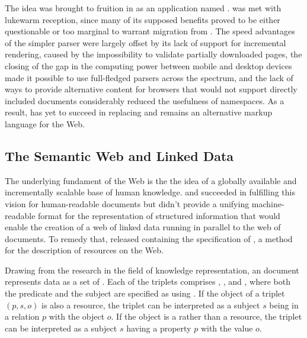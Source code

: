 \documentclass{book}
\begin{document}
The idea was brought to fruition in \cite{pemberton00} as an 
application named .  was met with lukewarm
reception, since many of its supposed benefits proved to be either questionable
or too marginal to warrant migration from . The speed advantages
of the simpler parser were largely offset by its lack of support for incremental
rendering, caused by the impossibility to validate partially downloaded pages,
the closing of the gap in the computing power between mobile and desktop devices
made it possible to use full-fledged  parsers across the spectrum,
and the lack of ways to provide alternative content for browsers that would not
support directly included  documents considerably reduced the
usefulness of  namespaces. As a result,  has yet to
succeed in replacing  and remains an alternative markup language
for the Web.


\subsection{The Semantic Web and Linked Data}
The underlying fundament of the Web is the the idea of a globally available and
incrementally scalable base of human knowledge.  and
 succeeded in fulfilling this vision for human-readable documents
but didn't provide a unifying machine-readable format for the representation of
structured information that would enable the creation of a web of linked data
running in parallel to the web of documents. To remedy that, 
released \cite{lassira99} containing the specification of , a
method for the description of resources on the Web.

Drawing from the research in the field of knowledge representation, an
 document represents data as a set of %
. Each of the triplets comprises , , and ,
where both the predicate and the subject are specified as 
 using . If the object of a triplet
$(p,s,o)$ is also a resource, the triplet can be interpreted as a subject $s$
being in a relation $p$ with the object $o$. If the object is a   rather than a resource, the triplet can be
interpreted as a subject $s$ having a property $p$ with the value $o$.
\end{document}

